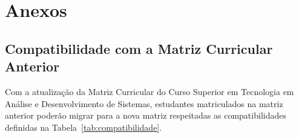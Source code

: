 \documentclass[11pt,fleqn]{book} %
\begin{document}
\chapter{Anexos}\label{conheca}
\vspace{6em}
\begin{flushright}
	\textit{\textcolor{white}{}}
\end{flushright}
\vspace{12em}

\newpage
\section{Compatibilidade com a Matriz Curricular Anterior}
\indent

Com a atualização da Matriz Curricular do Curso Superior em Tecnologia em Análise e Desenvolvimento de Sistemas, estudantes matriculados na matriz anterior poderão migrar para a nova matriz respeitadas as compatibilidades definidas na Tabela~\ref{tab:compatibilidade}.
\end{document}

